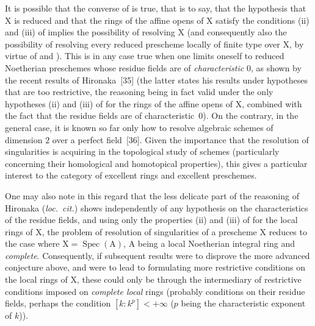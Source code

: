 \begin{remark}[7.9.6]
\label{IV.7.9.6}
It is possible that the converse of  is true, that is to say, that the hypothesis that $\mathrm{X}$ is reduced and that the rings of the affine opens of $\mathrm{X}$ satisfy the conditions (ii) and (iii) of  implies the possibility of resolving $\mathrm{X}$ (and consequently also the possibility of resolving every reduced prescheme locally of finite type over $\mathrm{X}$, by virtue of  and ). This is in any case true when one limits oneself to reduced Noetherian preschemes whose residue fields are of \emph{characteristic} $0$, as shown by the recent results of Hironaka~[35] (the latter states his results under hypotheses that are too restrictive, the reasoning being in fact valid under the only hypotheses (ii) and (iii) of  for the rings of the affine opens of $\mathrm{X}$, combined with the fact that the residue fields are of characteristic~$0$). On the contrary, in the general case, it is known so far only how to resolve algebraic schemes of dimension $2$ over a perfect field~[36]. Given the importance that the resolution of singularities is acquiring in the topological study of schemes (particularly concerning their homological and homotopical properties), this gives a particular interest to the category of excellent rings and excellent preschemes.

One may also note in this regard that the less delicate part of the reasoning of Hironaka (\emph{loc.\ cit.}) shows independently of any hypothesis on the characteristics of the residue fields, and using only the properties (ii) and (iii) of  for the local rings of $\mathrm{X}$, the problem of resolution of singularities of a prescheme $\mathrm{X}$ reduces to the case where $\mathrm{X}=\operatorname{Spec}(\mathrm{A})$, $\mathrm{A}$ being a local Noetherian integral ring and \emph{complete}. Consequently, if subsequent results were to disprove the more advanced conjecture above, and were to lead to formulating more restrictive conditions on the local rings of $\mathrm{X}$, these could only be through the intermediary of restrictive conditions imposed on \emph{complete local} rings (probably conditions on their residue fields, perhaps the condition $[k:k^p]<+\infty$ ($p$ being the characteristic exponent of $k$)).
\end{remark}

